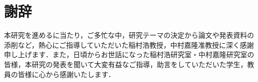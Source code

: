 \chapter*{謝辞}

本研究を進めるに当たり，ご多忙な中，研究テーマの決定から論文や発表資料の添削など，熱心にご指導していただいた稲村浩教授，中村嘉隆准教授に深く感謝申し上げます．また，日頃からお世話になった稲村浩研究室・中村嘉隆研究室の皆様，本研究の発表を聞いて大変有益なご指導，助言をしていただいた学生，教員の皆様に心から感謝いたします．